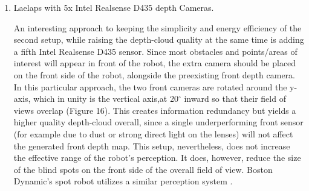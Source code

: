 \documentclass{article}
\begin{document}
\begin{enumerate}
\item Laelaps with 5x Intel Realsense D435 depth Cameras. 

An interesting approach to keeping the simplicity and energy efficiency of the second setup, while raising the depth-cloud quality at the same time is adding a fifth Intel Realsense D435 sensor. Since most obstacles and points/areas of interest will appear in front of the robot, the extra camera should be placed on the front side of the robot, alongside the preexisting front depth camera. In this particular approach, the two front cameras are rotated around the y-axis, which in unity is the vertical axis,at 20$^{\circ}$ inward so that their field of views overlap (Figure 16). This creates information redundancy but yields a higher quality depth-cloud overall, since a single underperforming front sensor (for example due to dust or strong direct light on the lenses) will not affect the generated front depth map. 
This setup, nevertheless, does not increase the effective range of the robot's perception. It does, however, reduce the size of the blind spots on the front side of the overall field of view. Boston Dynamic's spot robot utilizes a similar perception system \cite{noauthor_about_nodate}.


\end{enumerate}
\end{document}
